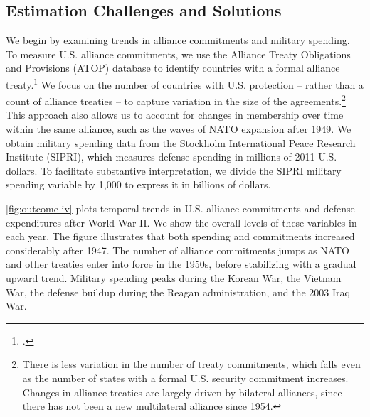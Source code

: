 \documentclass[12pt,hidelinks]{article}
\begin{document}
\thispagestyle{empty}

\clearpage

\doublespace 


\setcounter{page}{1}




\subsection*{Estimation Challenges and Solutions}


We begin by examining trends in alliance commitments and military spending. To measure U.S. alliance commitments, we use the Alliance Treaty Obligations and Provisions (ATOP) database to identify countries with a formal alliance treaty.\footcite{Leedsetal2002}
We focus on the number of countries with U.S. protection -- rather than a count of alliance treaties -- to capture variation in the size of the agreements.\footnote{There is less variation in the number of treaty commitments, which falls even as the number of states with a formal U.S. security commitment increases. Changes in alliance treaties are largely driven by bilateral alliances, since there has not been a new multilateral alliance since 1954.}  
This approach also allows us to account for changes in membership over time within the same alliance, such as the waves of NATO expansion after 1949. 
We obtain military spending data from the Stockholm International Peace Research Institute (SIPRI), which measures defense spending in millions of 2011 U.S. dollars.\autocite{SIPRI2019}
To facilitate substantive interpretation, we divide the SIPRI military spending variable by 1,000 to express it in billions of dollars.   


\autoref{fig:outcome-iv} plots temporal trends in U.S. alliance commitments and defense expenditures after World War II. 
We show the overall levels of these variables in each year. 
The figure illustrates that both spending and commitments increased considerably after 1947. 
The number of alliance commitments jumps as NATO and other treaties enter into force in the 1950s, before stabilizing with a gradual upward trend. 
Military spending peaks during the Korean War, the Vietnam War, the defense buildup during the Reagan administration, and the 2003 Iraq War. 
\end{document}
